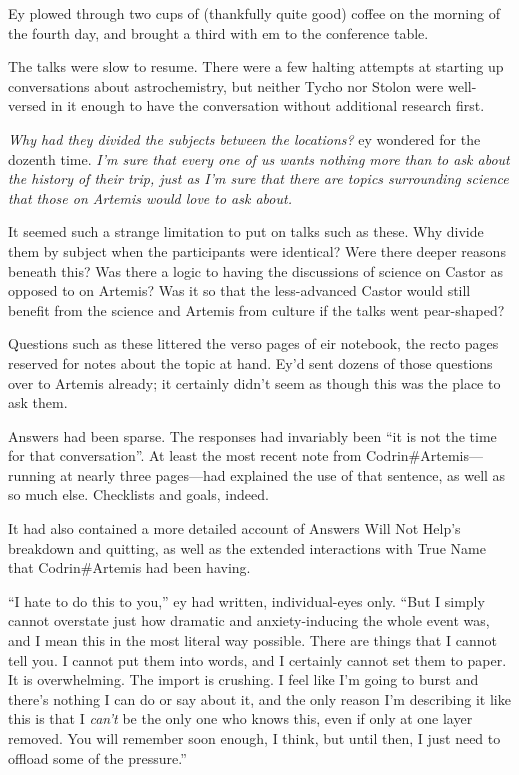 Ey plowed through two cups of (thankfully quite good) coffee on the morning of the fourth day, and brought a third with em to the conference table.

The talks were slow to resume. There were a few halting attempts at starting up conversations about astrochemistry, but neither Tycho nor Stolon were well-versed in it enough to have the conversation without additional research first.

\emph{Why had they divided the subjects between the locations?} ey wondered for the dozenth time. \emph{I'm sure that every one of us wants nothing more than to ask about the history of their trip, just as I'm sure that there are topics surrounding science that those on Artemis would love to ask about.}

It seemed such a strange limitation to put on talks such as these. Why divide them by subject when the participants were identical? Were there deeper reasons beneath this? Was there a logic to having the discussions of science on Castor as opposed to on Artemis? Was it so that the less-advanced Castor would still benefit from the science and Artemis from culture if the talks went pear-shaped?

Questions such as these littered the verso pages of eir notebook, the recto pages reserved for notes about the topic at hand. Ey'd sent dozens of those questions over to Artemis already; it certainly didn't seem as though this was the place to ask them.

Answers had been sparse. The responses had invariably been ``it is not the time for that conversation''. At least the most recent note from Codrin\#Artemis—running at nearly three pages—had explained the use of that sentence, as well as so much else. Checklists and goals, indeed.

It had also contained a more detailed account of Answers Will Not Help's breakdown and quitting, as well as the extended interactions with True Name that Codrin\#Artemis had been having.

``I hate to do this to you,'' ey had written, individual-eyes only. ``But I simply cannot overstate just how dramatic and anxiety-inducing the whole event was, and I mean this in the most literal way possible. There are things that I cannot tell you. I cannot put them into words, and I certainly cannot set them to paper. It is overwhelming. The import is crushing. I feel like I'm going to burst and there's nothing I can do or say about it, and the only reason I'm describing it like this is that I \emph{can't} be the only one who knows this, even if only at one layer removed. You will remember soon enough, I think, but until then, I just need to offload some of the pressure.''

